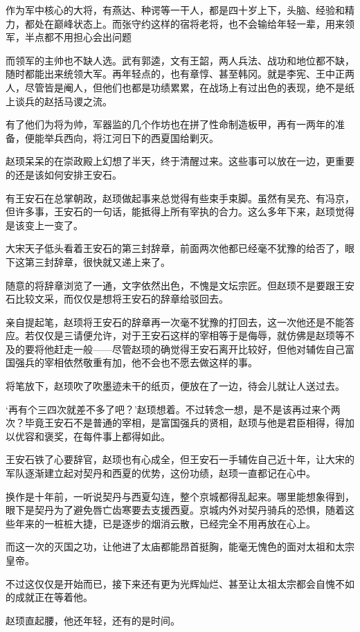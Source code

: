 作为军中核心的大将，有燕达、种谔等一干人，都是四十岁上下，头脑、经验和精力，都处在巅峰状态上。而张守约这样的宿将老将，也不会输给年轻一辈，用来领军，半点都不用担心会出问题

而领军的主帅也不缺人选。武有郭逵，文有王韶，两人兵法、战功和地位都不缺，随时都能出来统领大军。再年轻点的，也有章惇、甚至韩冈。就是李宪、王中正两人，尽管皆是阉人，但他们也都是功绩累累，在战场上有过出色的表现，绝不是纸上谈兵的赵括马谡之流。

有了他们为将为帅，军器监的几个作坊也在拼了性命制造板甲，再有一两年的准备，便能举兵西向，将江河日下的西夏国给剿灭。

赵顼呆呆的在崇政殿上幻想了半天，终于清醒过来。这些事可以放在一边，更重要的还是该如何安排王安石。

有王安石在总掌朝政，赵顼做起事来总觉得有些束手束脚。虽然有吴充、有冯京，但许多事，王安石的一句话，能抵得上所有宰执的合力。这么多年下来，赵顼觉得是该变上一变了。

大宋天子低头看着王安石的第三封辞章，前面两次他都已经毫不犹豫的给否了，眼下这第三封辞章，很快就又递上来了。

随意的将辞章浏览了一通，文字依然出色，不愧是文坛宗匠。但赵顼不是要跟王安石比较文采，而仅仅是想将王安石的辞章给驳回去。

亲自提起笔，赵顼将王安石的辞章再一次毫不犹豫的打回去，这一次他还是不能答应。若仅仅是三请便允许，对于王安石这样的宰相等于是侮辱，就仿佛是赵顼等不及的要将他赶走一般——尽管赵顼的确觉得王安石离开比较好，但他对辅佐自己富国强兵的宰相依然敬重有加，他不会也不愿去做这样的事。

将笔放下，赵顼吹了吹墨迹未干的纸页，便放在了一边，待会儿就让人送过去。

‘再有个三四次就差不多了吧？’赵顼想着。不过转念一想，是不是该再过来个两次？毕竟王安石不是普通的宰相，是富国强兵的贤相，赵顼与他是君臣相得，得加以优容和褒奖，在每件事上都得如此。

王安石铁了心要辞官，赵顼也有心成全，但王安石一手辅佐自己近十年，让大宋的军队逐渐建立起对契丹和西夏的优势，这份功绩，赵顼一直都记在心中。

换作是十年前，一听说契丹与西夏勾连，整个京城都得乱起来。哪里能想象得到，眼下是契丹为了避免唇亡齿寒要去支援西夏。京城内外对契丹骑兵的恐惧，随着这些年来的一桩桩大捷，已是逐步的烟消云散，已经完全不用再放在心上。

而这一次的灭国之功，让他进了太庙都能昂首挺胸，能毫无愧色的面对太祖和太宗皇帝。

不过这仅仅是开始而已，接下来还有更为光辉灿烂、甚至让太祖太宗都会自愧不如的成就正在等着他。

赵顼直起腰，他还年轻，还有的是时间。

